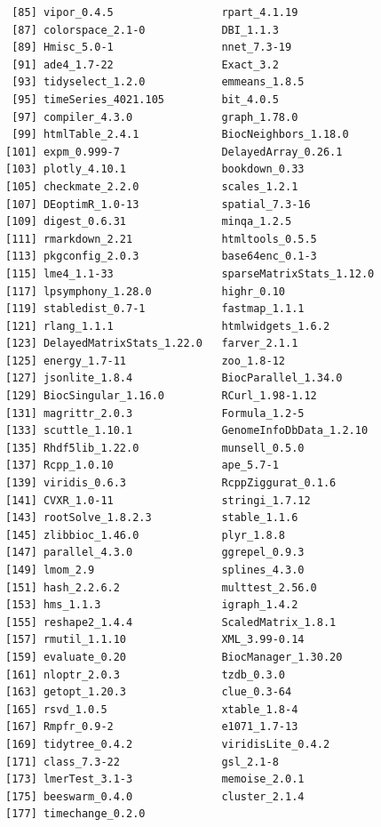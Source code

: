 \documentclass[
]{book}
\begin{document}
\begin{verbatim}
 [85] vipor_0.4.5                 rpart_4.1.19               
 [87] colorspace_2.1-0            DBI_1.1.3                  
 [89] Hmisc_5.0-1                 nnet_7.3-19                
 [91] ade4_1.7-22                 Exact_3.2                  
 [93] tidyselect_1.2.0            emmeans_1.8.5              
 [95] timeSeries_4021.105         bit_4.0.5                  
 [97] compiler_4.3.0              graph_1.78.0               
 [99] htmlTable_2.4.1             BiocNeighbors_1.18.0       
[101] expm_0.999-7                DelayedArray_0.26.1        
[103] plotly_4.10.1               bookdown_0.33              
[105] checkmate_2.2.0             scales_1.2.1               
[107] DEoptimR_1.0-13             spatial_7.3-16             
[109] digest_0.6.31               minqa_1.2.5                
[111] rmarkdown_2.21              htmltools_0.5.5            
[113] pkgconfig_2.0.3             base64enc_0.1-3            
[115] lme4_1.1-33                 sparseMatrixStats_1.12.0   
[117] lpsymphony_1.28.0           highr_0.10                 
[119] stabledist_0.7-1            fastmap_1.1.1              
[121] rlang_1.1.1                 htmlwidgets_1.6.2          
[123] DelayedMatrixStats_1.22.0   farver_2.1.1               
[125] energy_1.7-11               zoo_1.8-12                 
[127] jsonlite_1.8.4              BiocParallel_1.34.0        
[129] BiocSingular_1.16.0         RCurl_1.98-1.12            
[131] magrittr_2.0.3              Formula_1.2-5              
[133] scuttle_1.10.1              GenomeInfoDbData_1.2.10    
[135] Rhdf5lib_1.22.0             munsell_0.5.0              
[137] Rcpp_1.0.10                 ape_5.7-1                  
[139] viridis_0.6.3               RcppZiggurat_0.1.6         
[141] CVXR_1.0-11                 stringi_1.7.12             
[143] rootSolve_1.8.2.3           stable_1.1.6               
[145] zlibbioc_1.46.0             plyr_1.8.8                 
[147] parallel_4.3.0              ggrepel_0.9.3              
[149] lmom_2.9                    splines_4.3.0              
[151] hash_2.2.6.2                multtest_2.56.0            
[153] hms_1.1.3                   igraph_1.4.2               
[155] reshape2_1.4.4              ScaledMatrix_1.8.1         
[157] rmutil_1.1.10               XML_3.99-0.14              
[159] evaluate_0.20               BiocManager_1.30.20        
[161] nloptr_2.0.3                tzdb_0.3.0                 
[163] getopt_1.20.3               clue_0.3-64                
[165] rsvd_1.0.5                  xtable_1.8-4               
[167] Rmpfr_0.9-2                 e1071_1.7-13               
[169] tidytree_0.4.2              viridisLite_0.4.2          
[171] class_7.3-22                gsl_2.1-8                  
[173] lmerTest_3.1-3              memoise_2.0.1              
[175] beeswarm_0.4.0              cluster_2.1.4              
[177] timechange_0.2.0           
\end{verbatim}
\end{document}
